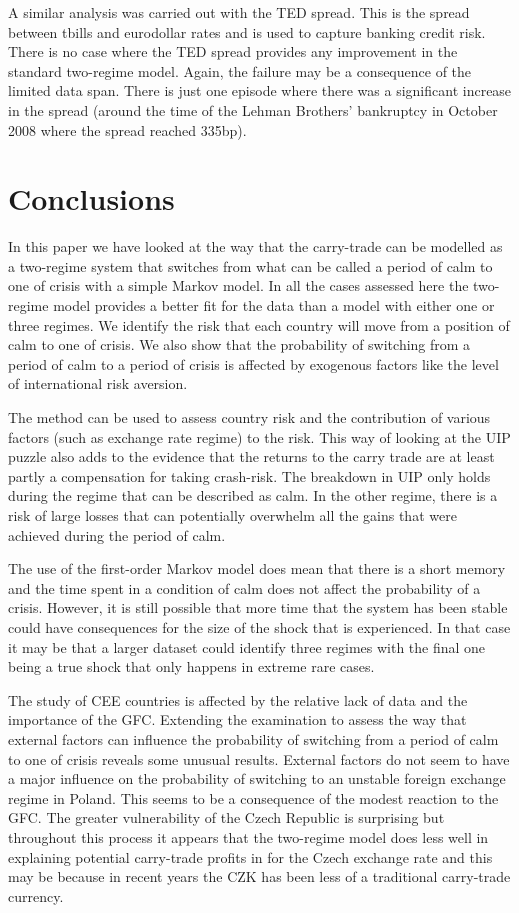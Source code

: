 \documentclass[12pt, a4paper, oneside]{article}\usepackage[]{graphicx}\usepackage[]{color}
\begin{document}
A similar analysis was carried out with the TED spread. This is the spread between tbills and eurodollar rates and is used to capture banking credit risk.  There is no case where the TED spread provides any improvement in the standard two-regime model.  Again, the failure may be a consequence of the limited data span. There is just one episode where there was a significant increase in the spread (around the time of the Lehman Brothers' bankruptcy in October 2008 where the spread reached 335bp).

\section{Conclusions}\label{secred:con}
In this paper we have looked at the way that the carry-trade can be modelled as a two-regime system that switches from what can be called a period of calm to one of crisis with a simple Markov model.  In all the cases assessed here the two-regime model provides a better fit for the data than a model with either one or three regimes. We identify the risk that each country will move from a position of calm to one of crisis. We also show that the probability of switching from a period of calm to a period of crisis is affected by exogenous factors like the level of international risk aversion.  

The method can be used to assess country risk and the contribution of various factors (such as exchange rate regime) to the risk.  This way of looking at the UIP puzzle also adds to the evidence that the returns to the carry trade are at least partly a compensation for taking crash-risk.  The breakdown in UIP only holds during the regime that can be described as calm.  In the other regime, there is a risk of large losses that can potentially overwhelm all the gains that were achieved during the period of calm. 

The use of the first-order Markov model does mean that there is a short memory and the time spent in a condition of calm does not affect the probability of a crisis.  However, it is still possible that more time that the system has been stable could have consequences for the size of the shock that is experienced. In that case it may be that a larger dataset could identify three regimes with the final one being a true shock that only happens in extreme rare cases. 

The study of CEE countries is affected by the relative lack of data and the importance of the GFC.  Extending the examination to assess the way that external factors can influence the probability of switching from a period of calm to one of crisis reveals some unusual results.  External factors do not seem to have a major influence on the probability of switching to an unstable foreign exchange regime in Poland.    This seems to be a consequence of the modest reaction to the  GFC.  The greater vulnerability of the Czech Republic is surprising but throughout this process it appears that the two-regime model does less well in explaining potential carry-trade profits in for the Czech exchange rate and this may be because in recent years the CZK has been less of a traditional carry-trade currency. 
\end{document}
